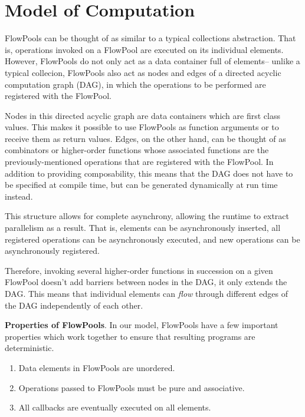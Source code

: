 \documentclass[runningheads,a4paper]{llncs}
\begin{document}


\section{Model of Computation}

FlowPools can be thought of as similar to a typical collections abstraction.
That is, operations invoked on a FlowPool are executed on its individual
elements. However, FlowPools do not only act as a data container full of
elements-- unlike a typical collecion, FlowPools also act as nodes and edges
of a directed acyclic computation graph (DAG), in which the operations to be
performed are registered with the FlowPool.

Nodes in this directed acyclic graph are data containers which are first class
values. This makes it possible to use FlowPools as function arguments or to receive
them as return values. Edges, on the other hand, can be thought of as
combinators or higher-order functions whose associated functions are the
previously-mentioned operations that are registered with the FlowPool. In
addition to providing composability, this means that the DAG does not have to
be specified at compile time, but can be generated dynamically at run time
instead.

This structure allows for complete asynchrony, allowing the runtime to extract
parallelism as a result. That is, elements can be asynchronously inserted, all
registered operations can be asynchronously executed, and new operations can
be asynchronously registered.

Therefore, invoking several higher-order functions in succession on a given
FlowPool doesn't add barriers between nodes in the DAG, it only extends the
DAG. This means that individual elements can \textit{flow} through different
edges of the DAG independently of each other.

\textbf{Properties of FlowPools}. In our model, FlowPools have a few important properties
which work together to ensure that resulting programs are deterministic.

\begin{enumerate}
\item Data elements in FlowPools are unordered.
\item Operations passed to FlowPools must be pure and associative.
\item All callbacks are eventually executed on all elements.
\end{enumerate}
\end{document}
